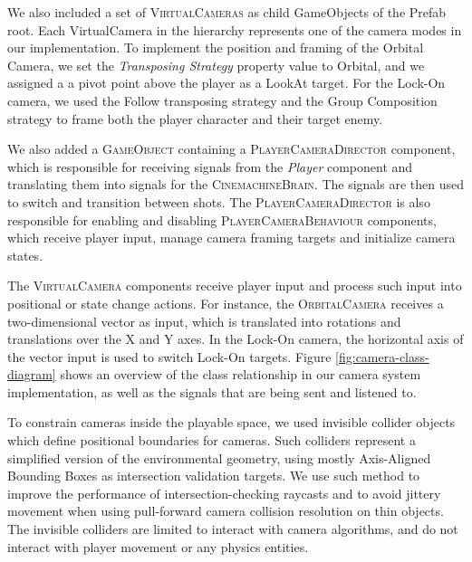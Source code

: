 
We also included a set of \textsc{VirtualCameras} as child GameObjects of the Prefab root. Each VirtualCamera in the hierarchy represents one of the camera modes in our implementation. To implement the position and framing of the Orbital Camera, we set the \emph{Transposing Strategy} property value to Orbital, and we assigned a a pivot point above the player as a LookAt target. For the Lock-On camera, we used the Follow transposing strategy and the Group Composition strategy to frame both the player character and their target enemy.

We also added a \textsc{GameObject} containing a \textsc{PlayerCameraDirector} component, which is responsible for receiving signals from the \emph{Player} component and translating them into signals for the \textsc{CinemachineBrain}. The signals are then used to switch and transition between shots. The \textsc{PlayerCameraDirector} is also responsible for enabling and disabling \textsc{PlayerCameraBehaviour} components, which receive player input, manage camera framing targets and initialize camera states.

The \textsc{VirtualCamera} components receive player input and process such input into positional or state change actions. For instance, the \textsc{OrbitalCamera} receives a two-dimensional vector as input, which is translated into rotations and translations over the X and Y axes. In the Lock-On camera, the horizontal axis of the vector input is used to switch Lock-On targets. Figure \ref{fig:camera-class-diagram} shows an overview of the class relationship in our camera system implementation, as well as the signals that are being sent and listened to.



To constrain cameras inside the playable space, we used invisible collider objects which define positional boundaries for cameras. Such colliders represent a simplified version of the environmental geometry, using mostly Axis-Aligned Bounding Boxes as intersection validation targets. We use such method to improve the performance of intersection-checking raycasts and to avoid jittery movement when using pull-forward camera collision resolution on thin objects. The invisible colliders are limited to interact with camera algorithms, and do not interact with player movement or any physics entities.

